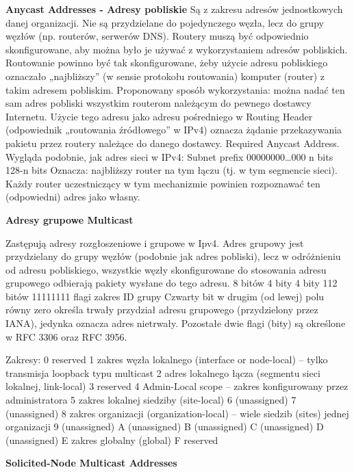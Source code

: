     \textbf{Anycast Addresses - Adresy pobliskie}
    Są z zakresu adresów jednostkowych danej organizacji. Nie są przydzielane do pojedynczego
    węzła, lecz do grupy węzłów (np. routerów, serwerów DNS). Routery muszą być
    odpowiednio skonfigurowane, aby można było je używać z wykorzystaniem adresów
    pobliskich. Routowanie powinno być tak skonfigurowane, żeby użycie adresu pobliskiego
    oznaczało „najbliższy” (w sensie protokołu routowania) komputer (router) z takim adresem
    pobliskim.
    Proponowany sposób wykorzystania: można nadać ten sam adres pobliski wszystkim
    routerom należącym do pewnego dostawcy Internetu. Użycie tego adresu jako adresu
    pośredniego w Routing Header (odpowiednik „routowania źródłowego” w IPv4) oznacza
    żądanie przekazywania pakietu przez routery należące do danego dostawcy.
    Required Anycast Address.
    Wygląda podobnie, jak adres sieci w IPv4:
    Subnet prefix 00000000…000
    n bits 128-n bits
    Oznacza: najbliższy router na tym łączu (tj. w tym segmencie sieci). Każdy router
    uczestniczący w tym mechanizmie powinien rozpoznawać ten (odpowiedni) adres jako
    własny.


    \textbf{Adresy grupowe Multicast}

    Zastępują adresy rozgłoszeniowe i grupowe w Ipv4. Adres grupowy jest przydzielany do
    grupy węzłów (podobnie jak adres pobliski), lecz w odróżnieniu od adresu pobliskiego,
    wszystkie węzły skonfigurowane do stosowania adresu grupowego odbierają pakiety
    wysłane do tego adresu.
    8 bitów 4 bity 4 bity 112 bitów
    11111111 flagi zakres ID grupy
    Czwarty bit w drugim (od lewej) polu równy zero określa trwały przydział adresu grupowego
    (przydzielony przez IANA), jedynka oznacza adres nietrwały. Pozostałe dwie flagi (bity) są
    określone w RFC 3306 oraz RFC 3956.

    Zakresy:
    0 reserved
    1 zakres węzła lokalnego (interface or node-local) – tylko transmisja loopback typu multicast
    2 adres lokalnego łącza (segmentu sieci lokalnej, link-local)
    3 reserved
    4 Admin-Local scope – zakres konfigurowany przez administratora
    5 zakres lokalnej siedziby (site-local)
    6 (unassigned)
    7 (unassigned)
    8 zakres organizacji (organization-local) – wiele siedzib (sites) jednej organizacji
    9 (unassigned)
    A (unassigned)
    B (unassigned)
    C (unassigned)
    D (unassigned)
    E zakres globalny (global)
    F reserved

    \textbf{Solicited-Node Multicast Addresses}

